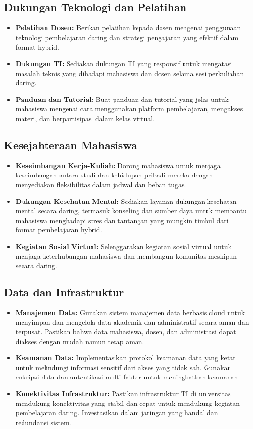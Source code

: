 \subsection{Dukungan Teknologi dan Pelatihan}
\begin{itemize}
	\item \textbf{Pelatihan Dosen:} Berikan pelatihan kepada dosen mengenai penggunaan teknologi pembelajaran daring dan strategi pengajaran yang efektif dalam format hybrid.
	\item \textbf{Dukungan TI:} Sediakan dukungan TI yang responsif untuk mengatasi masalah teknis yang dihadapi mahasiswa dan dosen selama sesi perkuliahan daring.
	\item \textbf{Panduan dan Tutorial:} Buat panduan dan tutorial yang jelas untuk mahasiswa mengenai cara menggunakan platform pembelajaran, mengakses materi, dan berpartisipasi dalam kelas virtual.
\end{itemize}

\subsection{Kesejahteraan Mahasiswa}
\begin{itemize}
	\item \textbf{Keseimbangan Kerja-Kuliah:} Dorong mahasiswa untuk menjaga keseimbangan antara studi dan kehidupan pribadi mereka dengan menyediakan fleksibilitas dalam jadwal dan beban tugas.
	\item \textbf{Dukungan Kesehatan Mental:} Sediakan layanan dukungan kesehatan mental secara daring, termasuk konseling dan sumber daya untuk membantu mahasiswa menghadapi stres dan tantangan yang mungkin timbul dari format pembelajaran hybrid.
	\item \textbf{Kegiatan Sosial Virtual:} Selenggarakan kegiatan sosial virtual untuk menjaga keterhubungan mahasiswa dan membangun komunitas meskipun secara daring.
\end{itemize}

\subsection{Data dan Infrastruktur}
\begin{itemize}
	\item \textbf{Manajemen Data:} Gunakan sistem manajemen data berbasis cloud untuk menyimpan dan mengelola data akademik dan administratif secara aman dan terpusat. Pastikan bahwa data mahasiswa, dosen, dan administrasi dapat diakses dengan mudah namun tetap aman.
	\item \textbf{Keamanan Data:} Implementasikan protokol keamanan data yang ketat untuk melindungi informasi sensitif dari akses yang tidak sah. Gunakan enkripsi data dan autentikasi multi-faktor untuk meningkatkan keamanan.
	\item \textbf{Konektivitas Infrastruktur:} Pastikan infrastruktur TI di universitas mendukung konektivitas yang stabil dan cepat untuk mendukung kegiatan pembelajaran daring. Investasikan dalam jaringan yang handal dan redundansi sistem.
\end{itemize}


